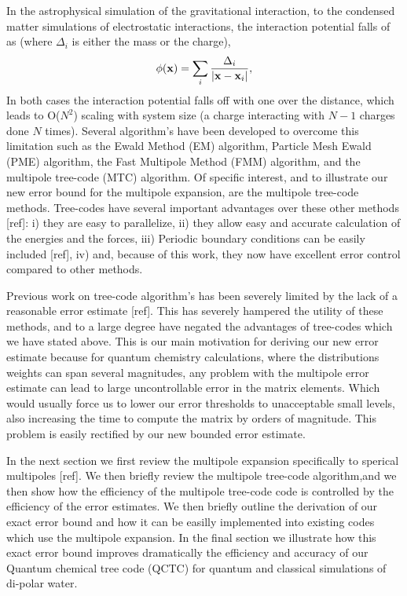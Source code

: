 \documentclass[prb,aps,nobibnotes,twocolumn,doublespace,twocolumngrid,superbib]{revtex4}
\begin{document}
%
In the astrophysical simulation of the gravitational interaction, to the condensed matter simulations of 
electrostatic interactions, the interaction potential falls of as (where $\Delta_i$ is either the mass 
or the charge), 
\begin{equation}
\phi({\bf x})= \sum_i {\Delta_i \over |{\bf x} - {\bf x}_i|},
\end{equation}
% 
In both cases the interaction potential falls off with one over the distance, 
which leads to {\cal O}($N^2$) scaling with system size (a charge interacting with $N-1$ 
charges done $N$ times). 
%
Several algorithm's have been developed to overcome this limitation such as the 
Ewald Method (EM)  \cite{DFincham94} algorithm, 
Particle Mesh Ewald (PME) \cite{luty:94}  algorithm, 
the Fast Multipole Method (FMM) \cite{Singh93,shimada:94,singer:95a}  algorithm,
and the multipole tree-code (MTC) \cite{JSalmon94} algorithm. 
%
Of specific interest, and to illustrate our new error bound for the multipole expansion, 
are the multipole tree-code methods. 
%
Tree-codes have several important advantages over these other methods [ref]: i) 
they are easy to parallelize, ii) they allow easy and accurate calculation of the 
energies and the forces, iii) Periodic boundary conditions can be easily included [ref], iv) 
and, because of this work, they now have excellent error control compared to other methods.
%

Previous work on tree-code algorithm's has been severely limited by the lack of
a reasonable error estimate [ref]. 
%
This has severely hampered the utility of these methods, and to a large degree have negated the advantages
of tree-codes which we have stated above.
%
This is our main motivation for deriving our new error estimate because for quantum chemistry calculations, 
where the distributions weights can span several magnitudes, any problem with the multipole error 
estimate can lead to large uncontrollable error in the matrix elements. 
%
Which would usually force us to lower our error 
thresholds to unacceptable small levels, also increasing the time to compute the matrix by orders of
magnitude. 
%
This problem is easily rectified by our new bounded error estimate.
%
%
%

In the next section we first review the multipole expansion specifically to sperical multipoles [ref]. 
%
We then briefly review the multipole tree-code algorithm,and we then show how the efficiency of 
the multipole tree-code code is controlled by the efficiency of the error estimates. 
%
We then briefly outline the derivation of our exact error bound and how it can be easilly implemented 
into existing codes which use the multipole expansion.
%
In the final section we illustrate how this exact error bound improves dramatically the efficiency 
and accuracy of our Quantum chemical tree code (QCTC) for quantum and classical simulations 
of di-polar water.
\end{document}
